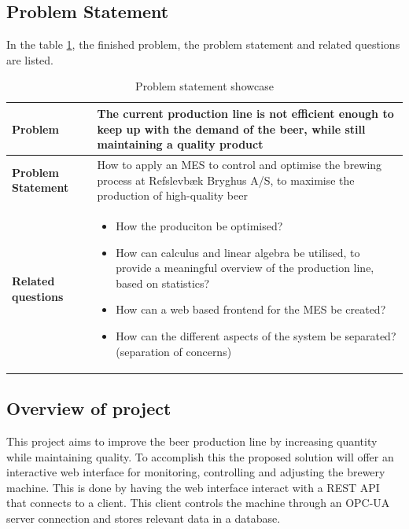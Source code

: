 \subsection{Problem Statement}
In the table \ref{table:problem-statement-report}, the finished problem, the problem statement and related questions are listed.
\begin{table}[ht]
    \begin{tabularx}{\textwidth}{|>{\RaggedRight}p{4cm}|>{\RaggedRight}X|}
        \hline
        \textbf{Problem} & The current production line is not efficient enough to keep up with the demand of the beer, while still maintaining a quality product\\
        \hline
        \textbf{Problem Statement} & How to apply an MES to control and optimise the brewing process at Refslevbæk Bryghus A/S, to maximise the production of high-quality beer\\
        \hline
        \textbf{Related questions} & 
            \begin{itemize}
                \item How the produciton be optimised?
                \item How can calculus and linear algebra be utilised, to provide a meaningful overview of the production line, based on statistics?
                \item How can a web based frontend for the MES be created?
                \item How can the different aspects of the system be separated? (separation of concerns)
            \end{itemize} \\
            \hline
    \end{tabularx}
    \caption{Problem statement showcase} 
    \label{table:problem-statement-report}
\end{table} 

\subsection{Overview of project}
This project aims to improve the beer production line by increasing quantity
while maintaining quality. To accomplish this the proposed solution will offer
an interactive web interface for monitoring, controlling and adjusting the
brewery machine. This is done by having the web interface interact with a REST
API that connects to a client. This client controls the machine through an
OPC-UA server connection and stores relevant data in a database.

